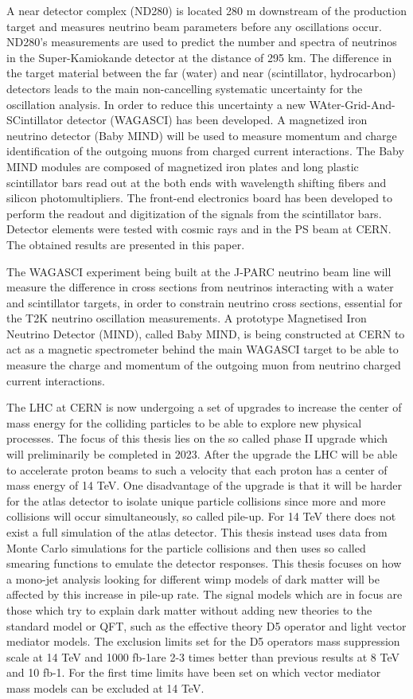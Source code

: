 A near detector complex (ND280) is located 280 m downstream of the production target and measures neutrino beam parameters before any oscillations occur.
 ND280's measurements are used to predict the number and spectra of neutrinos in the Super-Kamiokande detector at the distance of 295 km. 
 The difference in the target material between the far (water) and near (scintillator, hydrocarbon) detectors leads to the main non-cancelling systematic uncertainty for the oscillation analysis. 
 In order to reduce this uncertainty a new WAter-Grid-And-SCintillator detector (WAGASCI) has been developed. 
 A magnetized iron neutrino detector (Baby MIND) will be used to measure momentum and charge identification of the outgoing muons from charged current interactions. 
 The Baby MIND modules are composed of magnetized iron plates and long plastic scintillator bars read out at the both ends with wavelength shifting fibers and silicon photomultipliers. 
 The front-end electronics board has been developed to perform the readout and digitization of the signals from the scintillator bars. Detector elements were tested with cosmic rays and in the PS beam at CERN. 
 The obtained results are presented in this paper.


The WAGASCI experiment being built at the J-PARC neutrino beam line will measure the difference in cross sections from neutrinos interacting with a water and scintillator targets, in order to constrain neutrino cross sections, essential for the T2K neutrino oscillation measurements. A prototype Magnetised Iron Neutrino Detector (MIND), called Baby MIND, is being constructed at CERN to act as a magnetic spectrometer behind the main WAGASCI target to be able to measure the charge and momentum of the outgoing muon from neutrino charged current interactions.


The LHC at CERN is now undergoing a set of upgrades to increase the center of mass energy for the colliding particles to be able to explore new physical processes. The focus of this thesis lies on the so called phase II upgrade which will preliminarily be completed in 2023. After the upgrade the LHC will be able to accelerate proton beams to such a velocity that each proton has a center of mass energy of 14 TeV. One disadvantage of the upgrade is that it will be harder for the atlas detector to isolate unique particle collisions since more and more collisions will occur simultaneously, so called pile-up. For 14 TeV there does not exist a full simulation of the atlas detector. This thesis instead uses data from Monte Carlo simulations for the particle collisions and then uses so called smearing functions to emulate the detector responses. This thesis focuses on how a mono-jet analysis looking for different wimp models of dark matter will be affected by this increase in pile-up rate. The signal models which are in focus are those which try to explain dark matter without adding new theories to the standard model or QFT, such as the effective theory D5 operator and light vector mediator models. The exclusion limits set for the D5 operators mass suppression scale at 14 TeV and 1000 fb-1are 2-3 times better than previous results at 8 TeV and 10 fb-1. For the first time limits have been set on which vector mediator mass models can be excluded at 14 TeV.
\fi



